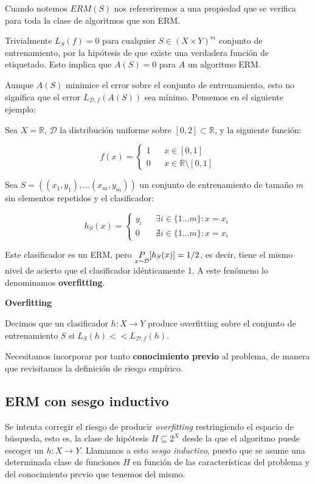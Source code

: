 Cuando notemos $ERM(S)$ nos refereriremos a una propiedad que se verifica para toda la clase de algoritmos que son ERM.

Trivialmente $L_S(f) = 0$ para cualquier $S \in (X \times Y)^m$ conjunto de entrenamiento, por la hipótesis de que existe una
verdadera función de etiquetado. Esto implica que $A(S) = 0$ para $A$ un algoritmo ERM.

Aunque $A(S)$ minimice el error sobre el conjunto de entrenamiento, esto no significa que el error $L_{\mathcal{D},f} (A(S))$ 
sea mínimo. Pensemos en el siguiente ejemplo:

\begin{example}
Sea $X = \mathbb{R}$, $\mathcal{D}$ la distribución uniforme sobre $[0,2]\subset \mathbb{R}$, y la siguiente función:

\[f(x) = \left\{\begin{array}{lcl}
1 && x\in [0,1]\\
0 && x\in \mathbb{R}\setminus [0,1]
\end{array}\right.\]


Sea $S = ((x_1,y_1), \ldots (x_m, y_m))$ un conjunto de entrenamiento de tamaño $m$ sin elementos repetidos y el clasificador:

\[h_S(x) = \left\{\begin{array}{lcl}
y_i && \exists i\in \{1\ldots m\} : x=x_i\\
0 && \nexists i\in \{1\ldots m\} : x=x_i
\end{array}\right.\]

Este clasificador es un ERM, pero $\underset{x\sim \mathcal{D}}{P}[h_S(x)] = 1/2$, es decir, tiene el mismo nivel de acierto que el 
clasificador idénticamente 1. A este fenómeno lo denominamos \textbf{overfitting}.
\end{example}

\begin{definition*} \textbf{Overfitting}

 Decimos que un clasificador $h: X\rightarrow Y$ produce overfitting sobre el conjunto de entrenamiento 
 $S$ si $L_S(h) << L_{\mathcal{D},f}(h)$.
\end{definition*}

Necesitamos incorporar por tanto \textbf{conocimiento previo} al problema, de manera que revisitamos la definición de riesgo
empírico.

\subsection{ERM con sesgo inductivo}
Se intenta corregir el riesgo de producir \emph{overfitting} restringiendo el espacio de búsqueda, esto es, la clase de 
hipótesis $H \subseteq 2^X$ desde la que el algoritmo puede escoger un $h: X\rightarrow Y$. Llamamos a esto 
\emph{sesgo inductivo}, puesto que se asume una determinada clase de funciones $H$ en función de las 
características del problema y del conocimiento previo que tenemos del mismo.

